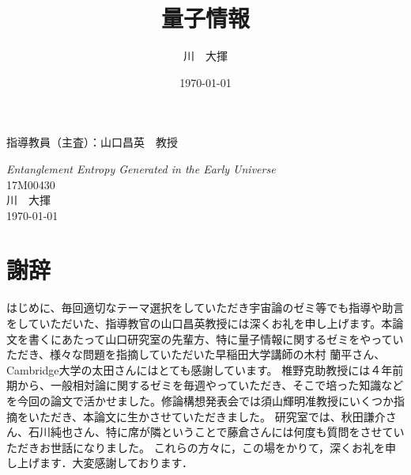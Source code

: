 \documentclass[a4paper,11pt,oneside,openany]{jsbook}
\title{量子情報}
\author{川　大揮}
\date{\today}
\begin{document}
%
%
\begin{titlepage}
\begin{flushright}
{\large
指導教員（主査）：山口昌英　教授  %
}
\end{flushright}
\begin{center}
\vspace*{150truept}
{\LARGE \textit{Entanglement Entropy Generated in the Early Universe}}\\ %
\vspace{120truept}
{\Large17M00430}\\ %
\vspace{50truept}
{\Large 川　大揮}\\ %
\vspace{50truept}
{\today}\\ %
\end{center}
\end{titlepage}
%
%
\frontmatter
%


\tableofcontents
%
%
\mainmatter
%




%
%
\appendix
%





%
\chapter*{謝辞}
はじめに、毎回適切なテーマ選択をしていただき宇宙論のゼミ等でも指導や助言をしていただいた、指導教官の山口昌英教授には深くお礼を申し上げます。本論文を書くにあたって山口研究室の先輩方、特に量子情報に関するゼミをやっていただき、様々な問題を指摘していただいた早稲田大学講師の木村 蘭平さん、Cambridge大学の太田さんにはとても感謝しています。
椎野克助教授には４年前期から、一般相対論に関するゼミを毎週やっていただき、そこで培った知識などを今回の論文で活かせました。修論構想発表会では須山輝明准教授にいくつか指摘をいただき、本論文に生かさせていただきました。
研究室では、秋田謙介さん、石川純也さん、特に席が隣ということで藤倉さんには何度も質問をさせていただきお世話になりました。
これらの方々に，この場をかりて，深くお礼を申し上げます．大変感謝しております．
%

%
%
\newpage
\printindex
%
%
\end{document}
